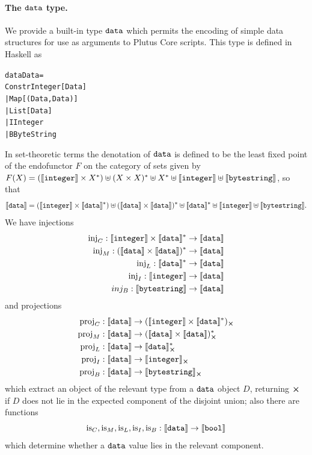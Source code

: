 \paragraph{The $\mathtt{data}$ type.}
We provide a built-in type $\mathtt{data}$ which permits the encoding of simple data
structures for use as arguments to Plutus Core scripts.  This type is defined in
Haskell as
\begin{alltt}
   data Data =
      Constr Integer [Data]
      | Map [(Data, Data)]
      | List [Data]
      | I Integer
      | B ByteString
\end{alltt}

\noindent In set-theoretic terms the denotation of $\mathtt{data}$ is
defined to be the least fixed point of the endofunctor $F$ on the category of
sets given by $F(X) = (\llbracket\mathit{\mathtt{integer}}\rrbracket \times X^*) \uplus (X \times X)^* \uplus
X^* \uplus \llbracket\mathit{\mathtt{integer}}\rrbracket \uplus \llbracket\mathit{\mathtt{bytestring}}\rrbracket$, so that
$$ \llbracket\mathit{\mathtt{data}}\rrbracket = (\llbracket\mathit{\mathtt{integer}}\rrbracket \times \llbracket\mathit{\mathtt{data}}\rrbracket^*)
               \uplus (\llbracket\mathit{\mathtt{data}}\rrbracket \times \llbracket\mathit{\mathtt{data}}\rrbracket)^*
               \uplus \llbracket\mathit{\mathtt{data}}\rrbracket^*
               \uplus \llbracket\mathit{\mathtt{integer}}\rrbracket
               \uplus \llbracket\mathit{\mathtt{bytestring}}\rrbracket.
$$
We have injections
\begin{align*}
  \operatorname{inj}_C: \llbracket\mathit{\mathtt{integer}}\rrbracket \times \llbracket\mathit{\mathtt{data}}\rrbracket^* & \to \llbracket\mathit{\mathtt{data}}\rrbracket \\
  \operatorname{inj}_M: (\llbracket\mathit{\mathtt{data}}\rrbracket \times \llbracket\mathit{\mathtt{data}}\rrbracket)^*  & \to \llbracket\mathit{\mathtt{data}}\rrbracket \\
  \operatorname{inj}_L: \llbracket\mathit{\mathtt{data}}\rrbracket^* & \to \llbracket\mathit{\mathtt{data}}\rrbracket \\
  \operatorname{inj}_I: \llbracket\mathit{\mathtt{integer}}\rrbracket & \to \llbracket\mathit{\mathtt{data}}\rrbracket \\
  inj_B: \llbracket\mathit{\mathtt{bytestring}}\rrbracket & \to \llbracket\mathit{\mathtt{data}}\rrbracket \\
\end{align*}
\noindent and projections
\begin{align*}
  \proj_C: \denote{\ty{data}} & \to \withError{(\denote{\ty{integer}} \times \denote{\ty{data}}^*)}\\
  \proj_M: \denote{\ty{data}} & \to \withError{(\denote{\ty{data}} \times \denote{\ty{data}})^*}\\
  \proj_L: \denote{\ty{data}} & \to \withError{\denote{\ty{data}}^* }\\
  \proj_I: \denote{\ty{data}} & \to \withError{\denote{\ty{integer}}}\\
  \proj_B: \denote{\ty{data}} & \to \withError{\denote{\ty{bytestring}} }\\
\end{align*}
\noindent which extract an object of the relevant type from a $\mathtt{data}$ object
$D$, returning $\errorX$ if $D$ does not lie in the expected component of the
disjoint union; also there are functions
$$
\operatorname{is}_C, \operatorname{is}_M, \operatorname{is}_L, \operatorname{is}_I, \operatorname{is}_B: \llbracket\mathit{\mathtt{data}}\rrbracket \to \llbracket\mathit{\mathtt{bool}}\rrbracket
$$
\noindent which determine whether a $\mathtt{data}$ value lies in the relevant component.

